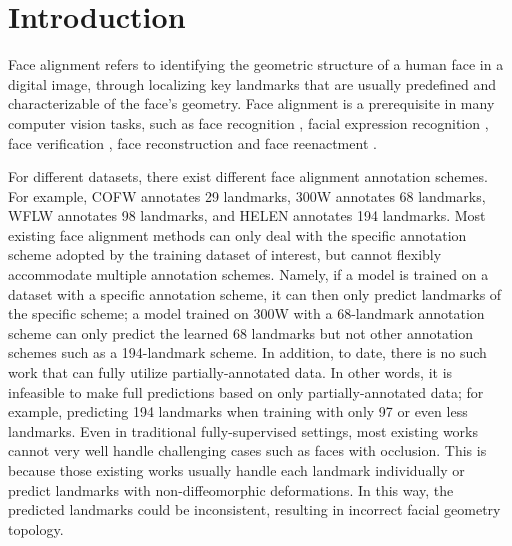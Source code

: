 \documentclass[10pt,twocolumn,letterpaper]{article}
\begin{document}
\section{Introduction}
Face alignment refers to identifying the geometric structure of a human face in a digital image, through localizing key landmarks that are usually predefined and characterizable of the face's geometry. Face alignment is a prerequisite in many computer vision tasks, such as face recognition \cite{Yi_2013_CVPR},  facial expression recognition \cite{sariyanidi2015automatic, yang2018geometry}, face verification \cite{taigman2014deepface}, face reconstruction \cite{richardson2017learning} and face reenactment \cite{nirkin2019fsgan}. 

For different datasets, there exist different face alignment annotation schemes. For example, COFW \cite{burgos2013robust} annotates 29 landmarks, 300W \cite{sagonas2013300} annotates 68 landmarks,  WFLW \cite{Wu_2018_CVPR} annotates 98 landmarks, and HELEN \cite{le2012interactive} annotates 194 landmarks. Most existing face alignment methods can only deal with the specific annotation scheme adopted by the training dataset of interest, but cannot flexibly accommodate multiple annotation schemes. Namely, if a model is trained on a dataset with a specific annotation scheme, it can then only predict landmarks of the specific scheme; a model trained on 300W with a 68-landmark annotation scheme can only predict the learned 68 landmarks but not other annotation schemes such as a 194-landmark scheme. In addition, to date, there is no such work that can fully utilize partially-annotated data. In other words, it is infeasible to make full predictions based on only partially-annotated data; for example, predicting 194 landmarks when training with only 97 or even less landmarks. Even in traditional fully-supervised settings, most existing works cannot very well handle challenging cases such as faces with occlusion. This is because those existing works usually handle each landmark individually or predict landmarks with non-diffeomorphic deformations. In this way, the predicted landmarks could be inconsistent, resulting in incorrect facial geometry topology.
\end{document}
